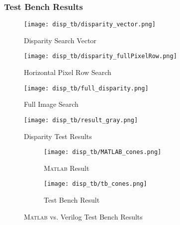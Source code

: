\subsubsection{Test Bench Results}
\begin{figure}[H]
	\centerline{\texttt{[image: disp\_tb/disparity\_vector.png]}}
	\caption{Disparity Search Vector}
	\label{disparityVector}
\end{figure}

\begin{figure}[H]
	\centerline{\texttt{[image: disp\_tb/disparity\_fullPixelRow.png]}}
	\caption{Horizontal Pixel Row Search}
	\label{disparityRowSearch}
\end{figure}

\begin{figure}[H]
	\centerline{\texttt{[image: disp\_tb/full\_disparity.png]}}
	\caption{Full Image Search}
	\label{disparityFullSearch}
\end{figure}

\begin{figure}[H]
	\centerline{\texttt{[image: disp\_tb/result\_gray.png]}}
	\caption{Disparity Test Results}
	\label{disparityTestResults}
\end{figure}

\begin{figure}[H]
	 \begin{subfigure}[h]{1.0\textwidth}
             \centerline{\texttt{[image: disp\_tb/MATLAB\_cones.png]}}
             \caption{\textsc{Matlab} Result}
			\label{disparityMatlabResult}
         \end{subfigure} 
         \begin{subfigure}[h]{1.0\textwidth}
              \centerline{\texttt{[image: disp\_tb/tb\_cones.png]}}
             \caption{Test Bench Result}
			\label{disparityVerilogResult}
         \end{subfigure}
\label{disparityVerilogvsMatlab}
\caption{\textsc{Matlab} vs. Verilog Test Bench Results}
\end{figure}


